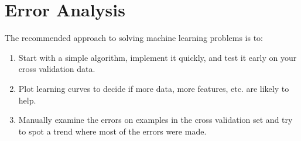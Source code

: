 \section{Error Analysis}

The recommended approach to solving machine learning problems is to:

\begin{enumerate}
\item Start with a simple algorithm, implement it quickly, and test it early on your cross validation data.
\item Plot learning curves to decide if more data, more features, etc. are likely to help.
\item Manually examine the errors on examples in the cross validation set and try to spot a trend where most of the errors were made.
\end{enumerate}

